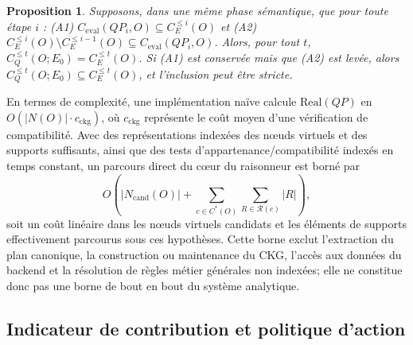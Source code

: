 \documentclass[journal]{IEEEtran}
\newtheorem{proposition}{Proposition}
\begin{document}
\begin{proposition}
\label{prop:session-equivalence}
Supposons, dans une même phase sémantique, que pour toute étape $i$ : (A1) $C_{\mathrm{eval}}(QP_i,O)\subseteq C_E^{\le i}(O)$ et (A2) $C_E^{\le i}(O)\setminus C_E^{\le i-1}(O)\subseteq C_{\mathrm{eval}}(QP_i,O)$. Alors, pour tout $t$, $C_Q^{\le t}(O;E_0)=C_E^{\le t}(O)$. Si (A1) est conservée mais que (A2) est levée, alors $C_Q^{\le t}(O;E_0)\subseteq C_E^{\le t}(O)$, et l'inclusion peut être stricte.
\end{proposition}

En termes de complexité, une implémentation naïve calcule $\mathrm{Real}(QP)$ en $O(|N(O)|\cdot c_{\mathrm{ckg}})$, où $c_{\mathrm{ckg}}$ représente le coût moyen d'une vérification de compatibilité. Avec des représentations indexées des nœuds virtuels et des supports suffisants, ainsi que des tests d'appartenance/compatibilité indexés en temps constant, un parcours direct du cœur du raisonneur est borné par
\[
O\!\left(|N_{\mathrm{cand}}(O)|+\sum_{c\in C^*(O)}\sum_{R\in\mathcal R(c)}|R|\right),
\]
soit un coût linéaire dans les nœuds virtuels candidats et les éléments de supports effectivement parcourus sous ces hypothèses. Cette borne exclut l'extraction du plan canonique, la construction ou maintenance du CKG, l'accès aux données du backend et la résolution de règles métier générales non indexées; elle ne constitue donc pas une borne de bout en bout du système analytique.

\subsection{Indicateur de contribution et politique d'action}
\end{document}
